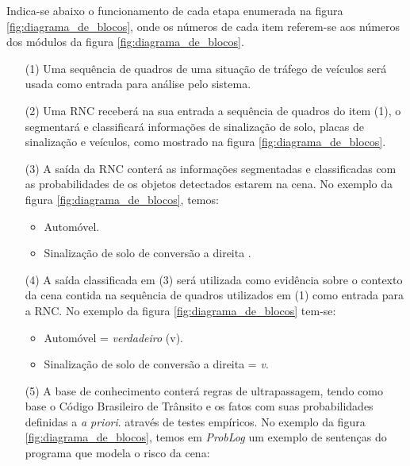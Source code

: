 \documentclass[
	12pt,				%
    oneside,			%
	a4paper,			%
	english,			%
	french,				%
	spanish,			%
	brazil,				%
	]{abntex2}
\begin{document}
Indica-se abaixo o funcionamento de cada etapa enumerada na figura \ref{fig:diagrama_de_blocos}, onde os números de cada item referem-se aos números dos módulos da figura \ref{fig:diagrama_de_blocos}.

\begin{enumerate}
    

    \item[{(1)}] Uma sequência de quadros de uma situação de tráfego de veículos será usada como entrada para análise pelo sistema.


    \item[{(2)}] Uma RNC receberá na sua entrada a sequência de quadros do item (1), o segmentará e classificará informações de sinalização de solo, placas de sinalização e veículos, como mostrado na figura \ref{fig:diagrama_de_blocos}.


    \item[{(3)}] A saída da RNC conterá as informações segmentadas e classificadas com as probabilidades de os objetos detectados estarem na cena. No exemplo da figura \ref{fig:diagrama_de_blocos}, temos:
        \begin{itemize}
            \item Automóvel.
            \item Sinalização de solo de conversão a direita . 
        \end{itemize}
        
    \item[{(4)}] A saída classificada em (3) será utilizada como evidência sobre o contexto da cena contida na sequência de quadros utilizados em (1) como entrada para a RNC. No exemplo da figura \ref{fig:diagrama_de_blocos} tem-se:
        \begin{itemize}
            \item Automóvel = \textit{verdadeiro} (v).
            \item Sinalização de solo de conversão a direita  = \textit{v}.
        \end{itemize}    
        

    \item[{(5)}] A base de conhecimento conterá regras de ultrapassagem, tendo como base o Código Brasileiro de Trânsito e os fatos com suas probabilidades definidas a  \textit{a priori}. através de testes empíricos. No exemplo da figura \ref{fig:diagrama_de_blocos}, temos em \textit{ProbLog} um exemplo de sentenças do programa que modela o risco da cena:
        \begin{itemize}
        

\end{itemize}
\end{enumerate}
\end{document}
